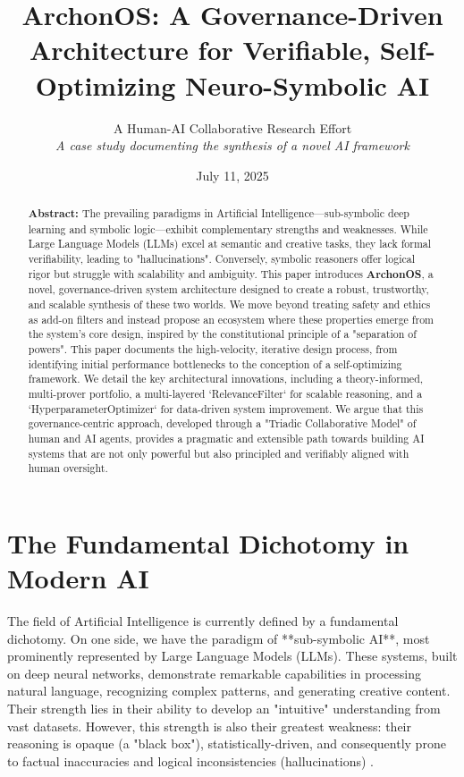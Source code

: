 \documentclass[11pt, a4paper]{article}
\title{\textbf{ArchonOS: A Governance-Driven Architecture for Verifiable, Self-Optimizing Neuro-Symbolic AI}\\[1cm]}
\author{
    A Human-AI Collaborative Research Effort \\
    \small{\textit{A case study documenting the synthesis of a novel AI framework}}
}
\date{July 11, 2025}
\begin{document}
\maketitle
\thispagestyle{empty}
\begin{abstract}
\noindent \textbf{Abstract:} The prevailing paradigms in Artificial Intelligence—sub-symbolic deep learning and symbolic logic—exhibit complementary strengths and weaknesses. While Large Language Models (LLMs) excel at semantic and creative tasks, they lack formal verifiability, leading to "hallucinations". Conversely, symbolic reasoners offer logical rigor but struggle with scalability and ambiguity. This paper introduces \textbf{ArchonOS}, a novel, governance-driven system architecture designed to create a robust, trustworthy, and scalable synthesis of these two worlds. We move beyond treating safety and ethics as add-on filters and instead propose an ecosystem where these properties emerge from the system's core design, inspired by the constitutional principle of a "separation of powers". This paper documents the high-velocity, iterative design process, from identifying initial performance bottlenecks to the conception of a self-optimizing framework. We detail the key architectural innovations, including a theory-informed, multi-prover portfolio, a multi-layered `RelevanceFilter` for scalable reasoning, and a `HyperparameterOptimizer` for data-driven system improvement. We argue that this governance-centric approach, developed through a "Triadic Collaborative Model" of human and AI agents, provides a pragmatic and extensible path towards building AI systems that are not only powerful but also principled and verifiably aligned with human oversight.
\end{abstract}
\tableofcontents
\newpage

\section{The Fundamental Dichotomy in Modern AI}
\label{sec:challenge}
The field of Artificial Intelligence is currently defined by a fundamental dichotomy. On one side, we have the paradigm of **sub-symbolic AI**, most prominently represented by Large Language Models (LLMs). These systems, built on deep neural networks, demonstrate remarkable capabilities in processing natural language, recognizing complex patterns, and generating creative content. Their strength lies in their ability to develop an "intuitive" understanding from vast datasets. However, this strength is also their greatest weakness: their reasoning is opaque (a "black box"), statistically-driven, and consequently prone to factual inaccuracies and logical inconsistencies (hallucinations) \cite{nesy_review}.
\end{document}
